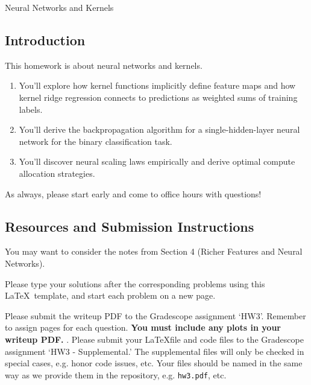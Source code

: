 \documentclass[submit]{../harvardml}
\begin{document}
\begin{center}
  {\Large Neural Networks and Kernels}\\
\end{center}

\subsection*{Introduction}

This homework is about neural networks and kernels.

\begin{enumerate}
  \item You'll explore how kernel functions implicitly define feature maps and how kernel ridge regression connects to predictions as weighted sums of training labels.
  \item You'll derive the backpropagation algorithm for a single-hidden-layer neural network for the binary classification task.
  \item You'll discover neural scaling laws empirically and derive optimal compute allocation strategies.
\end{enumerate}

As always, please start early and come to office hours with questions!

\subsection*{Resources and Submission Instructions}
You may want to consider the notes from Section 4 (Richer Features and Neural Networks).

Please type your solutions after the corresponding problems using this \LaTeX\ template, and start each problem on a new page.

Please submit the writeup PDF to the Gradescope assignment `HW3'. Remember to assign pages for each question.  \textbf{You must include any plots in your writeup PDF. }. Please submit your \LaTeX file and code files to the Gradescope assignment `HW3 - Supplemental.' The supplemental files will only be checked in special cases, e.g. honor code issues, etc. Your files should be named in the same way as we provide them in the repository, e.g. \texttt{hw3.pdf}, etc.

\newpage

\end{document}
